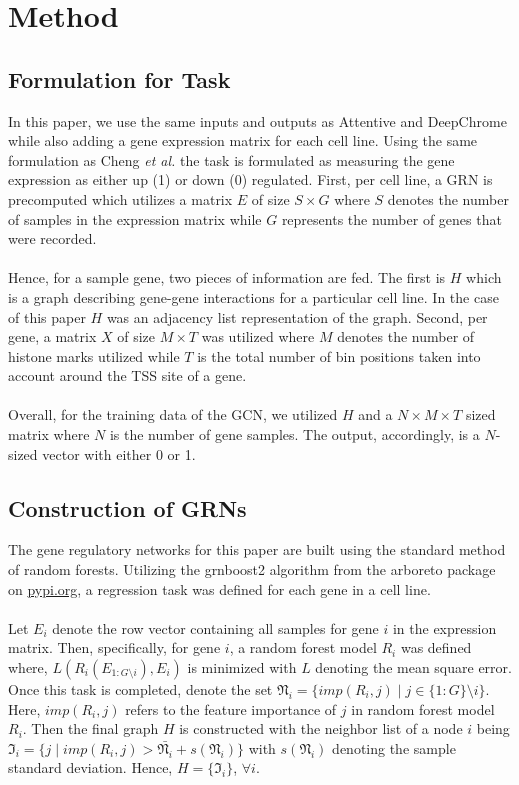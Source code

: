 \section{Method}
\subsection{Formulation for Task} 
In this paper, we use the same inputs and outputs as Attentive and DeepChrome while also adding a gene expression matrix for each cell line. Using the same formulation as Cheng \emph{et al.} the task is formulated as measuring the gene expression as either up (1) or down (0) regulated. First, per cell line, a GRN is precomputed which utilizes a matrix $E$ of size $S\times G$ where $S$ denotes the number of samples in the expression matrix while $G$ represents the number of genes that were recorded. \\\\
Hence, for a sample gene, two pieces of information are fed. The first is $H$ which is a graph describing gene-gene interactions for a particular cell line. In the case of this paper $H$ was an adjacency list representation of the graph. Second, per gene, a matrix $X$ of size $M\times T$ was utilized where $M$ denotes the number of histone marks utilized while $T$ is the total number of bin positions taken into account around the TSS site of a gene. \\\\
Overall, for the training data of the GCN, we utilized $H$ and a $N\times M\times T$ sized matrix where $N$ is the number of gene samples. The output, accordingly, is a $N$-sized vector with either 0 or 1.

\subsection{Construction of GRNs}
The gene regulatory networks for this paper are built using the standard method of random forests. Utilizing the grnboost2 algorithm from the arboreto package on \url{pypi.org}, a regression task was defined for each gene in a cell line. \\\\
Let $E_i$ denote the row vector containing all samples for gene $i$ in the expression matrix. Then, specifically, for gene $i$, a random forest model $R_i$ was defined where, $L(R_i(E_{1:G\setminus i}), E_i)$ is minimized with $L$ denoting the mean square error. Once this task is completed, denote the set $\mathfrak{N}_i = \{imp(R_i, j) \mid j \in \{1:G\}\setminus i\}$. Here, $imp(R_i, j)$ refers to the feature importance of $j$ in random forest model $R_i$. Then the final graph $H$ is constructed with the neighbor list of a node $i$ being $\mathfrak{I}_i = \{j \mid imp(R_i, j) > \bar{\mathfrak{N}_i} + s(\mathfrak{N}_i)\}$ with $s(\mathfrak{N}_i)$ denoting the sample standard deviation. Hence, $H = \{\mathfrak{I}_i\}$, $\forall i$.